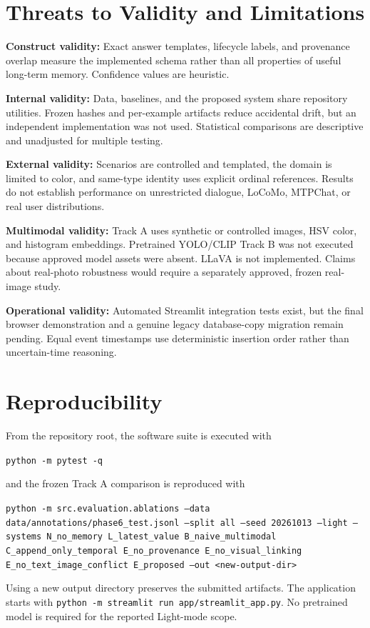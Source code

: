 \documentclass[conference]{IEEEtran}
\begin{document}
\section{Threats to Validity and Limitations}
\textbf{Construct validity:} Exact answer templates, lifecycle labels, and provenance overlap measure the implemented schema rather than all properties of useful long-term memory. Confidence values are heuristic.

\textbf{Internal validity:} Data, baselines, and the proposed system share repository utilities. Frozen hashes and per-example artifacts reduce accidental drift, but an independent implementation was not used. Statistical comparisons are descriptive and unadjusted for multiple testing.

\textbf{External validity:} Scenarios are controlled and templated, the domain is limited to color, and same-type identity uses explicit ordinal references. Results do not establish performance on unrestricted dialogue, LoCoMo, MTPChat, or real user distributions.

\textbf{Multimodal validity:} Track A uses synthetic or controlled images, HSV color, and histogram embeddings. Pretrained YOLO/CLIP Track B was not executed because approved model assets were absent. LLaVA is not implemented. Claims about real-photo robustness would require a separately approved, frozen real-image study.

\textbf{Operational validity:} Automated Streamlit integration tests exist, but the final browser demonstration and a genuine legacy database-copy migration remain pending. Equal event timestamps use deterministic insertion order rather than uncertain-time reasoning.

\section{Reproducibility}
From the repository root, the software suite is executed with
\begin{center}
\footnotesize\texttt{python -m pytest -q}
\end{center}
and the frozen Track A comparison is reproduced with
\begin{center}
\footnotesize\begin{minipage}{0.94\columnwidth}
\texttt{python -m src.evaluation.ablations --data data/annotations/phase6\_test.jsonl --split all --seed 20261013 --light --systems N\_no\_memory L\_latest\_value B\_naive\_multimodal C\_append\_only\_temporal E\_no\_provenance E\_no\_visual\_linking E\_no\_text\_image\_conflict E\_proposed --out <new-output-dir>}
\end{minipage}
\end{center}
Using a new output directory preserves the submitted artifacts. The application starts with \texttt{python -m streamlit run app/streamlit\_app.py}. No pretrained model is required for the reported Light-mode scope.
\end{document}
